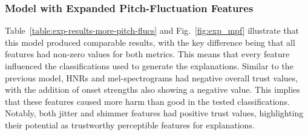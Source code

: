 \documentclass{article}
\begin{document}
\subsubsection{Model with Expanded Pitch-Fluctuation Features}
Table~\ref{table:exp-results-more-pitch-flucs} and Fig.~\ref{fig:exp_mpf} illustrate that this model produced comparable results, with the key difference being that all features had non-zero values for both metrics. This means that every feature influenced the classifications used to generate the explanations. Similar to the previous model, HNRs and mel-spectrograms had negative overall trust values, with the addition of onset strengths also showing a negative value. This implies that these features caused more harm than good in the tested classifications. Notably, both jitter and shimmer features had positive trust values, highlighting their potential as trustworthy perceptible features for explanations.
\end{document}
